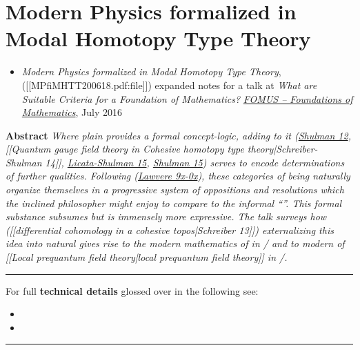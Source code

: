 \documentclass[12pt,titlepage]{article}
\theoremstyle{plain}
\theoremstyle{definition}
\theoremstyle{remark}
\begin{document}
\section*{Modern Physics formalized in Modal Homotopy Type Theory}
\begin{itemize}%
\item {}
\emph{Modern Physics formalized in Modal Homotopy Type Theory},
 ([[MPfiMHTT200618.pdf:file]])
expanded notes for a talk at
\emph{What are Suitable Criteria for a Foundation of Mathematics?}
\emph{\href{http://fomus.weebly.com/}{FOMUS -- Foundations of Mathematics}}, July 2016
\end{itemize}
\textbf{Abstract} \emph{Where plain  provides a formal concept-logic, adding   to it (\href{modal+type+theory}{Shulman 12}, [[Quantum gauge field theory in Cohesive homotopy type theory|Schreiber-Shulman 14]], \hyperlink{LicataShulman}{Licata-Shulman 15}, \hyperlink{Shulman15}{Shulman 15}) serves to encode determinations of further qualities. Following (\href{cohesive+topos#References}{Lawvere 9x-0x}), these categories of being naturally organize themselves in a progressive system of oppositions and resolutions which the inclined philosopher might enjoy to compare to the informal ``''. This formal substance subsumes   but is immensely more expressive. The talk surveys how ([[differential cohomology in a cohesive topos|Schreiber 13]]) externalizing this idea into natural  gives rise to the modern mathematics of  in / and to modern  of [[Local prequantum field theory|local prequantum field theory]] in /.}

\vspace{.5em} \hrule \vspace{.5em}
For full \textbf{technical details} glossed over in the following see:
\begin{itemize}%
\item {}
\item {}
\end{itemize}
\vspace{.5em} \hrule \vspace{.5em}
\end{document}
